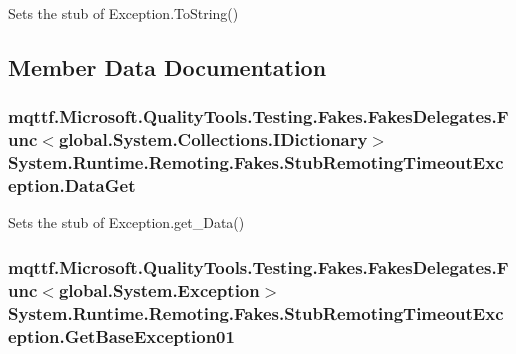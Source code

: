 Sets the stub of Exception.\-To\-String()



\subsection{Member Data Documentation}
\hypertarget{class_system_1_1_runtime_1_1_remoting_1_1_fakes_1_1_stub_remoting_timeout_exception_a556417f5b93232f5d688360c25e0429a}{
\subsubsection[{Data\-Get}]{\setlength{\rightskip}{0pt plus 5cm}mqttf.\-Microsoft.\-Quality\-Tools.\-Testing.\-Fakes.\-Fakes\-Delegates.\-Func$<$global.\-System.\-Collections.\-I\-Dictionary$>$ System.\-Runtime.\-Remoting.\-Fakes.\-Stub\-Remoting\-Timeout\-Exception.\-Data\-Get}}\label{class_system_1_1_runtime_1_1_remoting_1_1_fakes_1_1_stub_remoting_timeout_exception_a556417f5b93232f5d688360c25e0429a}


Sets the stub of Exception.\-get\-\_\-\-Data()

\hypertarget{class_system_1_1_runtime_1_1_remoting_1_1_fakes_1_1_stub_remoting_timeout_exception_ab55beb7aa8a5a04241d54d7b4b380795}{
\subsubsection[{Get\-Base\-Exception01}]{\setlength{\rightskip}{0pt plus 5cm}mqttf.\-Microsoft.\-Quality\-Tools.\-Testing.\-Fakes.\-Fakes\-Delegates.\-Func$<$global.\-System.\-Exception$>$ System.\-Runtime.\-Remoting.\-Fakes.\-Stub\-Remoting\-Timeout\-Exception.\-Get\-Base\-Exception01}}\label{class_system_1_1_runtime_1_1_remoting_1_1_fakes_1_1_stub_remoting_timeout_exception_ab55beb7aa8a5a04241d54d7b4b380795}


